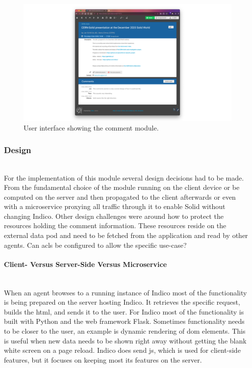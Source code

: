 \begin{figure}
    \centering
    \includegraphics[width=1\textwidth]{prototype/screen_design/indico-comments-screen_design.png}
    \caption{User interface showing the comment module.}
    \label{fig:indico-comments-screen_design}
\end{figure}

\subsubsection{Design}\mbox{}\\

For the implementation of this module several design decisions had to be made. From the fundamental choice of the module running on the client device or be computed on the server and then propagated to the client afterwards or even with a microservice proxying all traffic through it to enable Solid without changing Indico.
Other design challenges were around how to protect the resources holding the comment information. These resources reside on the external data pod and need to be fetched from the application and read by other agents. Can \glspl{acl} be configured to allow the specific use-case?

\paragraph{Client- Versus Server-Side Versus Microservice}\mbox{}\\

When an agent browses to a running instance of Indico most of the functionality is being prepared on the server hosting Indico. It retrieves the specific request, builds the \gls{html}, and sends it to the user. For Indico most of the functionality is built with Python and the web framework Flask. Sometimes functionality needs to be closer to the user, an example is dynamic rendering of \gls{dom} elements. This is useful when new data needs to be shown right away without getting the blank white screen on a page reload.
Indico does send \gls{js}, which is used for client-side features, but it focuses on keeping most its features on the server.


